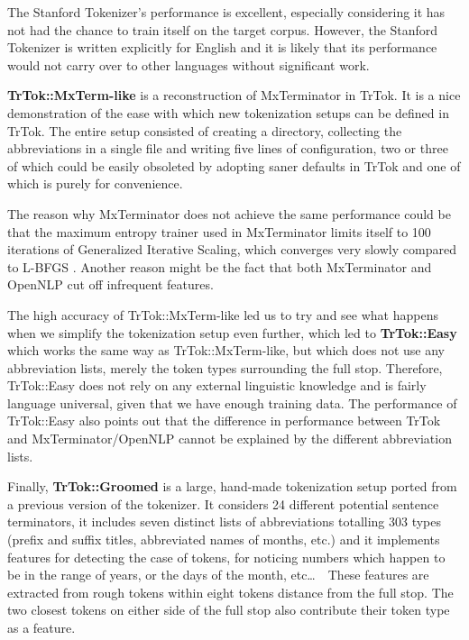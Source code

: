 The Stanford Tokenizer's performance is excellent, especially
considering it has not had the chance to train itself on the target
corpus. However, the Stanford Tokenizer is written explicitly for
English and it is likely that its performance would not carry over to
other languages without significant work.

\textbf{TrTok::MxTerm-like} is a reconstruction of MxTerminator in
TrTok. It is a nice demonstration of the ease with which new
tokenization setups can be defined in TrTok. The entire setup
consisted of creating a directory, collecting the abbreviations in a
single file and writing five lines of configuration, two or three of
which could be easily obsoleted by adopting saner defaults in TrTok
and one of which is purely for convenience.

The reason why MxTerminator does not achieve the same performance
could be that the maximum entropy trainer used in MxTerminator limits
itself to 100 iterations of Generalized Iterative Scaling, which
converges very slowly compared to L-BFGS \cite{maxent-algorithms}.
Another reason might be the fact that both MxTerminator and OpenNLP
cut off infrequent features.

The high accuracy of TrTok::MxTerm-like led us to try and see what
happens when we simplify the tokenization setup even further, which
led to \textbf{TrTok::Easy} which works the same way as
TrTok::MxTerm-like, but which does not use any abbreviation lists,
merely the token types surrounding the full stop. Therefore,
TrTok::Easy does not rely on any external linguistic knowledge and is
fairly language universal, given that we have enough training data.
The performance of TrTok::Easy also points out that the difference in
performance between TrTok and MxTerminator/OpenNLP cannot be explained
by the different abbreviation lists.

Finally, \textbf{TrTok::Groomed} is a large, hand-made tokenization
setup ported from a previous version of the tokenizer. It considers 24
different potential sentence terminators, it includes seven distinct
lists of abbreviations totalling 303 types (prefix and suffix titles,
abbreviated names of months, etc.) and it implements features for
detecting the case of tokens, for noticing numbers which happen to be
in the range of years, or the days of the month, etc\ldots\ \ These
features are extracted from rough tokens within eight tokens distance
from the full stop. The two closest tokens on either side of the full
stop also contribute their token type as a feature.

